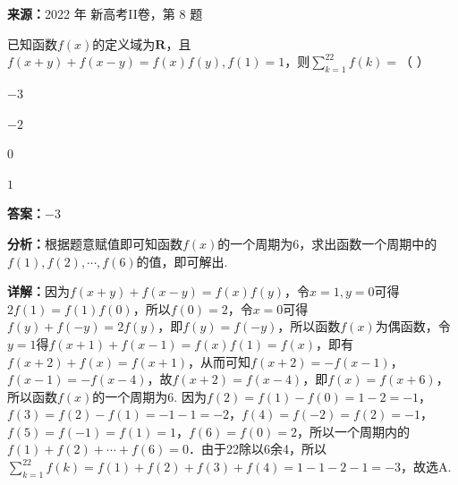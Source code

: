 \begin{question}[points=5]
\textbf{来源：}2022 年 新高考II卷，第 8 题\par
已知函数$f(x)$的定义域为$\mathbf{R}$，且$f(x+y)+f(x-y)=f(x)f(y),f(1)=1$，则$\displaystyle\sum_{k=1}^{22}f(k)=$（ ）
\begin{choices}
  \item $-3$
  \item $-2$
  \item $0$
  \item $1$
\end{choices}
\begin{solution}
\textbf{答案：}$-3$

\textbf{分析：}根据题意赋值即可知函数$f(x)$的一个周期为6，求出函数一个周期中的$f(1),f(2),\cdots,f(6)$的值，即可解出.

\textbf{详解：}因为$f(x+y)+f(x-y)=f(x)f(y)$，令$x=1,y=0$可得$2f(1)=f(1)f(0)$，所以$f(0)=2$，令$x=0$可得$f(y)+f(-y)=2f(y)$，即$f(y)=f(-y)$，所以函数$f(x)$为偶函数，令$y=1$得$f(x+1)+f(x-1)=f(x)f(1)=f(x)$，即有$f(x+2)+f(x)=f(x+1)$，从而可知$f(x+2)=-f(x-1)$，$f(x-1)=-f(x-4)$，故$f(x+2)=f(x-4)$，即$f(x)=f(x+6)$，所以函数$f(x)$的一个周期为6. 因为$f(2)=f(1)-f(0)=1-2=-1$，$f(3)=f(2)-f(1)=-1-1=-2$，$f(4)=f(-2)=f(2)=-1$，$f(5)=f(-1)=f(1)=1$，$f(6)=f(0)=2$，所以一个周期内的$f(1)+f(2)+\cdots+f(6)=0$．由于22除以6余4，所以$\sum_{k=1}^{22}f(k)=f(1)+f(2)+f(3)+f(4)=1-1-2-1=-3$，故选A.
\end{solution}
\end{question}

